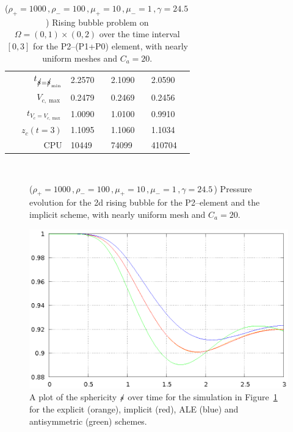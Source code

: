 \begin{table}
\begin{tabular}{rlll}
$t_{\strikes = \strikes_{\min}}$ & 2.2570 & 2.1090 & 2.0590 \\
$V_{c,\max}$                     & 0.2479 & 0.2469 & 0.2456 \\
$t_{V_c = V_{c,\max}}$           & 1.0090 & 1.0100 & 0.9910 \\
$z_c(t=3)$                       & 1.1095 & 1.1060 & 1.1034 \\
CPU                              &  10449 &  74099 & 410704 \\
\hline
\end{tabular}
\hspace*{-3.25cm}
\caption[Navier--Stokes 2d rising bubble benchmark values P2--(P1+P0)]
{($\rho_+ = 1000\,,\rho_- = 100\,,\mu_+ = 10\,,\mu_- =1\,,\gamma = 24.5\,$)
Rising bubble problem on ${\Omega = (0,1) \times (0,2)}$ over the time interval
$[0,3]$ for the P2--(P1+P0) element, with nearly uniform meshes and
$C_a=20$\textdegree.}
\label{tab:risingbubble2Dp2p1p0}
\end{table}

\begin{figure}[htbp]
\centering
{}
\\
\caption[Navier--Stokes 2d rising bubble pressure]
{($\rho_+ = 1000\,,\rho_- = 100\,,\mu_+ = 10\,,\mu_- =1\,,\gamma = 24.5\,$)
Pressure evolution for the 2d rising bubble for the P2--\pdg element and the
implicit scheme, with nearly uniform mesh and $C_a=20$\textdegree.}
\label{fig:rising_bubble_2d_pressure}
\end{figure}

\begin{figure}[htbp]
\centering
\includegraphics[width=.45\textwidth]
{figures/navier_stokes/2d_rising_bubble_sphericity.ps}
\caption[Navier--Stokes 2d rising bubble sphericity]
{A plot of the sphericity $\mbox{$s\!\!\!\!\:/$}$ over time for the simulation in
Figure~\ref{fig:rising_bubble_2d_pressure} for the explicit (orange), implicit
(red), ALE (blue) and antisymmetric (green) schemes.}
\label{fig:rising_bubble_2d_bulk_sphericity}
\end{figure}

